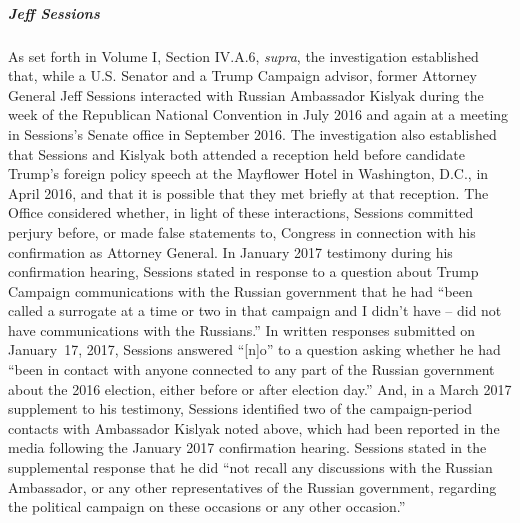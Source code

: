 

\subparagraph{Jeff Sessions}
As set forth in Volume I, Section IV.A.6, \textit{supra}, the investigation established that, while a U.S. Senator and a Trump Campaign advisor, former Attorney General Jeff Sessions interacted with Russian Ambassador Kislyak during the week of the Republican National Convention in July 2016 and again at a meeting in Sessions's Senate office in September 2016.
The investigation also established that Sessions and Kislyak both attended a reception held before candidate Trump's foreign policy speech at the Mayflower Hotel in Washington, D.C., in April 2016, and that it is possible that they met briefly at that reception.
The Office considered whether, in light of these interactions, Sessions committed perjury before, or made false statements to, Congress in connection with his confirmation as Attorney General.
In January 2017 testimony during his confirmation hearing, Sessions stated in response to a question about Trump Campaign communications with the Russian government that he had ``been called a surrogate at a time or two in that campaign and I didn't have -- did not have communications with the Russians.''
In written responses submitted on January~17, 2017, Sessions answered ``[n]o'' to a question asking whether he had ``been in contact with anyone connected to any part of the Russian government about the 2016 election, either before or after election day.''
And, in a March 2017 supplement to his testimony, Sessions identified two of the campaign-period contacts with Ambassador Kislyak noted above, which had been reported in the media following the January 2017 confirmation hearing.
Sessions stated in the supplemental response that he did ``not recall any discussions with the Russian Ambassador, or any other representatives of the Russian government, regarding the political campaign on these occasions or any other occasion.''

